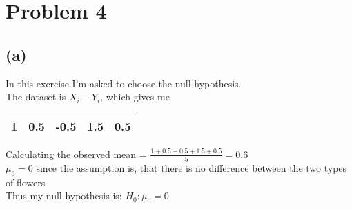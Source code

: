 \section{Problem 4}
\subsection{(a)}
In this exercise I'm asked to choose the null hypothesis.
\\
The dataset is $ X_i - Y_i $, which gives me
\begin{center}
    \begin{tabular}{ |c|c|c|c|c| } 
     \hline
      1 & 0.5 & -0.5 & 1.5 & 0.5\\ 
     \hline
    \end{tabular}
    \end{center}

Calculating the observed mean = $ \frac{1 + 0.5 - 0.5 + 1.5 + 0.5}{5} = 0.6 $
\\
$ \mu_0 = 0 $ since the assumption is, that there is no difference between the two types of flowers
\\
Thus my null hypothesis is: $ H_0 : \mu_0 = 0 $